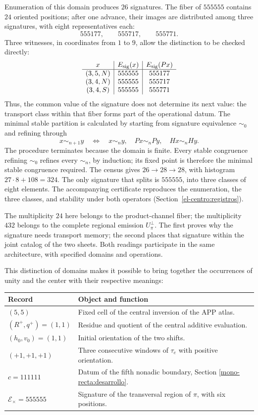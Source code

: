 Enumeration of this domain produces \(26\) signatures. The fiber of
\(555555\) contains \(24\) oriented positions; after one
advance, their images are distributed among three signatures, with eight
representatives each:
\[
 555177,\qquad555717,\qquad555771.
\]
Three witnesses, in coordinates from \(1\) to \(9\), allow the
distinction to be checked directly:
\[
\begin{array}{c|c|c}
x&E_{\rm sig}(x)&E_{\rm sig}(Px)\\\hline
(3,5,N)&555555&555177\\
(3,4,N)&555555&555717\\
(3,4,S)&555555&555771
\end{array}
\]
Thus, the common value of the signature does not determine its next value:
the transport class within that fiber forms part of the operational
datum. The minimal stable partition is calculated by starting from
signature equivalence \(\sim_0\) and refining through
\[
 x\sim_{n+1}y\quad\Longleftrightarrow\quad
 x\sim_n y,\quad Px\sim_n Py,\quad Hx\sim_n Hy.
\]
The procedure terminates because the domain is finite. Every stable
congruence refining \(\sim_0\) refines every \(\sim_n\), by induction;
its fixed point is therefore the minimal stable congruence required.
The census gives \(26\to28\to28\), with histogram
\(27\cdot8+108=324\). The only signature that splits is
\(555555\), into three classes of eight elements. The accompanying certificate
reproduces the enumeration, the three classes, and stability under both
operators (Section~\ref{el-centro:registros}).

The multiplicity \(24\) here belongs to the product-channel fiber;
the multiplicity \(432\) belongs to the complete regional emission
\(U_\pi^\perp\). The first proves why the signature needs transport
memory; the second places that signature within the joint catalog of
the two sheets. Both readings participate in the same architecture,
with specified domains and operations.

This distinction of domains makes it possible to bring together the occurrences of unity
and the center with their respective meanings:
\begin{center}
\small
\begin{tabularx}{\textwidth}{@{}lX@{}}
\toprule
Record & Object and function \\
\midrule
\((5,5)\) & Fixed cell of the central inversion of the APP atlas.\\
\((R^+,q^+)=(1,1)\) & Residue and quotient of the central additive evaluation.\\
\((h_0,v_0)=(1,1)\) & Initial orientation of the two shifts.\\
\((+1,+1,+1)\) & Three consecutive windows of \(\tau_e\) with positive orientation.\\
\(c=111111\) & Datum of the fifth nonadic boundary, Section \ref{mono-recta:desarrollo}.\\
\(\mathcal E_\times=555555\) & Signature of the transversal region of \(\pi\), with six positions.\\
\bottomrule
\end{tabularx}
\end{center}


